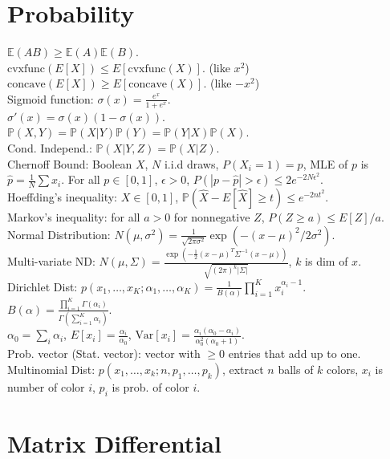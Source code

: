 \section{Probability}

$\mathbb{E}(AB) \geq \mathbb{E}(A)\mathbb{E}(B)$.\\
$\text{cvxfunc}(E[X]) \leq E[\text{cvxfunc}(X)]$. (like $x^2$)\\
$\text{concave}(E[X]) \geq E[\text{concave}(X)]$. (like $-x^2$)\\
Sigmoid function: $\sigma(x) = \frac{e^x}{1+e^x}$.\\
$\sigma'(x) = \sigma(x)(1-\sigma(x))$.\\
$\mathbb{P}(X, Y) = \mathbb{P}(X|Y)\mathbb{P}(Y) = \mathbb{P}(Y|X)\mathbb{P}(X)$.\\
Cond. Independ.: $\mathbb{P}(X|Y, Z) = \mathbb{P}(X|Z)$.\\
Chernoff Bound: Boolean $X$, $N$ i.i.d draws, $P(X_i=1)=p$, MLE of $p$ is $\hat{p}=\frac{1}{N}\sum x_i$. For all $p \in [0, 1]$, $\epsilon > 0$, $P(|p-\hat{p}| > \epsilon) \leq 2e^{-2N\epsilon^2}$.\\
Hoeffding's inequality: $X \in [0, 1]$, $\mathbb{P}(\hat{X} - E[\hat{X}] \geq t) \leq e^{-2nt^2}$.\\
Markov's inequality: for all $a > 0$ for nonnegative $Z$, $P(Z \geq a) \leq E[Z]/a$.\\
Normal Distribution: $N(\mu, \sigma^2) = \frac{1}{\sqrt{2 \pi \sigma^2}}\exp(-(x-\mu)^2/2\sigma^2)$.\\
Multi-variate ND: $N(\mu, \Sigma) = \frac{\exp(-\frac{1}{2}(x-\mu)^T\Sigma^{-1}(x-\mu))}{\sqrt{(2\pi)^k |\Sigma|}}$, $k$ is dim of $x$.\\
Dirichlet Dist: $p(x_1, \dots, x_K; \alpha_1, \dots, \alpha_K)=\frac{1}{B(\alpha)}\prod_{i=1}^K x_i^{\alpha_i - 1}$.\\
$B(\alpha) = \frac{\prod_{i=1}^K\Gamma(\alpha_i)}{\Gamma(\sum_{i=1}^K\alpha_i)}$.\\
$\alpha_0 = \sum_i \alpha_i$, $E[x_i]= \frac{\alpha_i}{\alpha_0}$, $\text{Var}[x_i] = \frac{\alpha_i(\alpha_0-\alpha_i)}{\alpha_0^2(\alpha_0+1)}$.\\
Prob. vector (Stat. vector): vector with $\geq 0$ entries that add up to one.\\
Multinomial Dist: $p(x_1, \dots, x_k; n, p_1, \dots, p_k)$, extract $n$ balls of $k$ colors, $x_i$ is number of color $i$, $p_i$ is prob. of color $i$.

\section{Matrix Differential}

